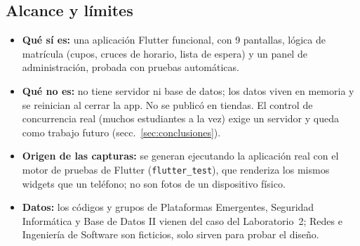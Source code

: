 \subsection{Alcance y límites}
\begin{itemize}
	\item \textbf{Qué sí es:} una aplicación Flutter funcional, con 9 pantallas, lógica de matrícula (cupos, cruces de horario, lista de espera) y un panel de administración, probada con pruebas automáticas.
	\item \textbf{Qué no es:} no tiene servidor ni base de datos; los datos viven en memoria y se reinician al cerrar la app. No se publicó en tiendas. El control de concurrencia real (muchos estudiantes a la vez) exige un servidor y queda como trabajo futuro (secc.~\ref{sec:conclusiones}).
	\item \textbf{Origen de las capturas:} se generan ejecutando la aplicación real con el motor de pruebas de Flutter (\texttt{flutter\_test}), que renderiza los mismos widgets que un teléfono; no son fotos de un dispositivo físico.
	\item \textbf{Datos:} los códigos y grupos de Plataformas Emergentes, Seguridad Informática y Base de Datos II vienen del caso del Laboratorio~2; Redes e Ingeniería de Software son ficticios, solo sirven para probar el diseño.
\end{itemize}
